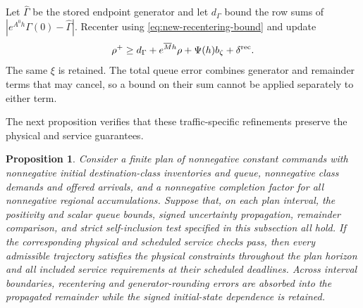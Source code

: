 \documentclass[preprint,12pt]{elsarticle}
\newtheorem{proposition}{Proposition}
\begin{document}
Let $\widehat\Gamma$ be the stored endpoint generator and let $d_\Gamma$
bound the row sums of $|e^{A^0h}\Gamma(0)-\widehat\Gamma|$. Recenter using
\eqref{eq:new-recentering-bound} and update
\begin{equation}
 \rho^+\ge d_\Gamma+e^{\overline{M}h}\rho+\Psi(h)b_\zeta+\delta^{\rm rec}.
 \label{eq:structure-endpoint-update}
\end{equation}
The same $\xi$ is retained. The total queue error combines generator and
remainder terms that may cancel, so a bound on their sum cannot be applied
separately to either term.

The next proposition verifies that these traffic-specific refinements
preserve the physical and service guarantees.

\begin{proposition}
\label{prop:structure-plan}
Consider a finite plan of nonnegative constant commands with nonnegative
initial destination-class inventories and queue, nonnegative class demands and
offered arrivals, and a nonnegative completion factor for all nonnegative
regional accumulations. Suppose that, on each plan interval, the positivity
and scalar queue bounds, signed uncertainty propagation, remainder comparison,
and strict self-inclusion test specified in this subsection all hold. If the
corresponding physical and scheduled service checks pass, then every admissible
trajectory satisfies the physical constraints throughout the plan horizon and
all included service requirements at their scheduled deadlines. Across
interval boundaries, recentering and generator-rounding errors are absorbed
into the propagated remainder while the signed initial-state dependence is
retained.
\end{proposition}
\end{document}
